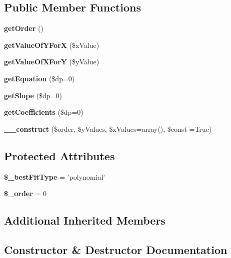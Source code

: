 \subsection*{Public Member Functions}
\begin{DoxyCompactItemize}
\item 
{\bf get\+Order} ()
\item 
{\bf get\+Value\+Of\+Y\+For\+X} (\$x\+Value)
\item 
{\bf get\+Value\+Of\+X\+For\+Y} (\$y\+Value)
\item 
{\bf get\+Equation} (\$dp=0)
\item 
{\bf get\+Slope} (\$dp=0)
\item 
{\bfseries get\+Coefficients} (\$dp=0)\label{class_p_h_p_excel___polynomial___best___fit_a10f4618687cea0c64ce7fc136ada6958}

\item 
{\bf \+\_\+\+\_\+construct} (\$order, \$y\+Values, \$x\+Values=array(), \$const =True)
\end{DoxyCompactItemize}
\subsection*{Protected Attributes}
\begin{DoxyCompactItemize}
\item 
{\bfseries \$\+\_\+best\+Fit\+Type} = 'polynomial'\label{class_p_h_p_excel___polynomial___best___fit_a4771ba52d86525c0c781339ec94f3466}

\item 
{\bfseries \$\+\_\+order} = 0\label{class_p_h_p_excel___polynomial___best___fit_a54a2050e77e4580d4f6b17e9da6760cb}

\end{DoxyCompactItemize}
\subsection*{Additional Inherited Members}


\subsection{Constructor \& Destructor Documentation}

